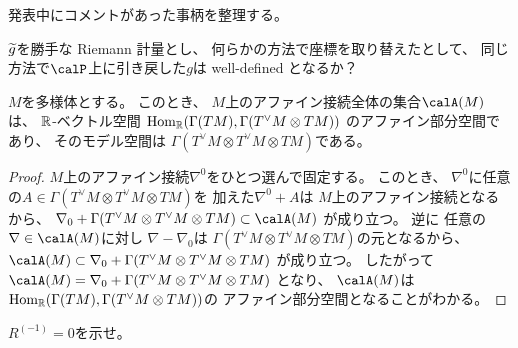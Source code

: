 \documentclass[report]{jlreq}
\begin{document}
%

発表中にコメントがあった事柄を整理する。

\begin{problem}
    $\widetilde{g}$を勝手な Riemann 計量とし、
    何らかの方法で座標を取り替えたとして、
    同じ方法で$\calP$上に引き戻した$g$は
    well-defined となるか？
\end{problem}

\begin{proposition}
    $M$を多様体とする。
    このとき、
    $M$上のアファイン接続全体の集合$\calA(M)$は、
    $\mathbb{R}$-ベクトル空間
    $\operatorname{Hom}_{\mathbb{R}}(\Gamma(TM), \Gamma(T^\vee M \otimes TM))$
    のアファイン部分空間であり、
    そのモデル空間は
    $\Gamma(T^\vee M \otimes T^\vee M \otimes TM)$である。
\end{proposition}

\begin{proof}
    $M$上のアファイン接続$\nabla^0$をひとつ選んで固定する。
    このとき、
    $\nabla^0$に任意の$A \in \Gamma(T^\vee M \otimes T^\vee M \otimes TM)$を
    加えた$\nabla^0 + A$は
    $M$上のアファイン接続となるから、
    $\nabla_0 + \Gamma(T^\vee M \otimes T^\vee M \otimes TM)
        \subset \calA(M)$
    が成り立つ。
    逆に
    任意の$\nabla \in \calA(M)$に対し
    $\nabla - \nabla_0$は
    $\Gamma(T^\vee M \otimes T^\vee M \otimes TM)$の元となるから、
    $\calA(M) \subset \nabla_0 + \Gamma(T^\vee M \otimes T^\vee M \otimes TM)$
    が成り立つ。
    したがって
    $\calA(M) = \nabla_0 + \Gamma(T^\vee M \otimes T^\vee M \otimes TM)$
    となり、
    $\calA(M)$は
    $\operatorname{Hom}_{\mathbb{R}}(\Gamma(TM), \Gamma(T^\vee M \otimes TM))$の
    アファイン部分空間となることがわかる。
\end{proof}

\begin{problem}
    $R^{(-1)} = 0$を示せ。
\end{problem}
\end{document}
